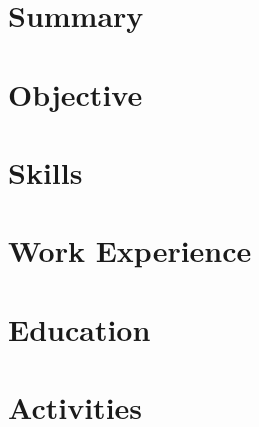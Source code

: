\documentclass[a4paper,10pt]{article}
\begin{document}
% 

\section{Summary}


\section{Objective}


\section{Skills}


\section{Work Experience}




\section{Education}



\section{Activities}


% 
\end{document}
